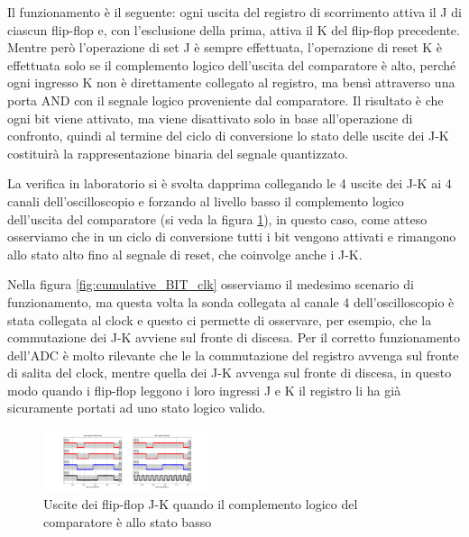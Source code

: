 \documentclass[journal]{IEEEtran}
\begin{document}
Il funzionamento è il seguente: ogni uscita del registro di scorrimento attiva il J di ciascun flip-flop e, con l'esclusione della prima, attiva il K del flip-flop precedente. Mentre però l'operazione di set J è sempre effettuata, l'operazione di reset K è effettuata solo se il complemento logico dell'uscita del comparatore è alto, perché ogni ingresso K non è direttamente collegato al registro, ma bensì attraverso una porta AND con il segnale logico proveniente dal comparatore. Il risultato è che ogni bit viene attivato, ma viene disattivato solo in base all'operazione di confronto, quindi al termine del ciclo di conversione lo stato delle uscite dei J-K costituirà la rappresentazione binaria del segnale quantizzato. 

La verifica in laboratorio si è svolta dapprima collegando le 4 uscite dei J-K ai 4 canali dell'oscilloscopio e forzando al livello basso il complemento logico dell'uscita del comparatore (si veda la figura \ref{fig:cumulative_BIT}), in questo caso, come atteso osserviamo che in un ciclo di conversione tutti i bit vengono attivati e rimangono allo stato alto fino al segnale di reset, che coinvolge anche i J-K.

Nella figura \ref{fig:cumulative_BIT_clk} osserviamo il medesimo scenario di funzionamento, ma questa volta la sonda collegata al canale 4 dell'oscilloscopio è stata collegata al clock e questo ci permette di osservare, per esempio, che la commutazione dei J-K avviene sul fronte di discesa. Per il corretto funzionamento dell'ADC è molto rilevante che le la commutazione del registro avvenga sul fronte di salita del clock, mentre quella dei J-K avvenga sul fronte di discesa, in questo modo quando i flip-flop leggono i loro ingressi J e K il registro li ha già sicuramente portati ad uno stato logico valido.

\begin{figure}[H]%
\begin{center}
\includegraphics[trim = {100 0 550 0}, clip, width=0.43\textwidth]{analysis/output/cumulative_BIT.pdf}
\caption{Uscite dei flip-flop J-K quando il complemento logico del comparatore è allo stato basso}
\label{fig:cumulative_BIT}
\end{center}
\end{figure}
\end{document}
